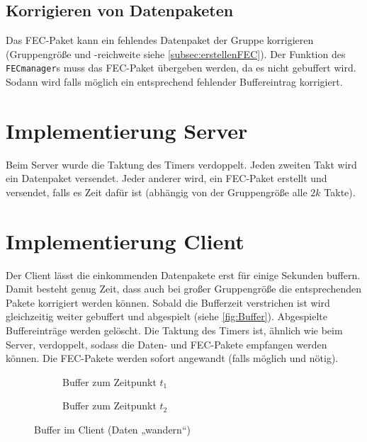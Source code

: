 \documentclass{scrartcl}
\begin{document}
\subsection{Korrigieren von Datenpaketen}
Das FEC-Paket kann ein fehlendes Datenpaket der Gruppe korrigieren (Gruppengröße und -reichweite siehe \autoref{subsec:erstellenFEC}). Der Funktion des \lstinline`FECmanager`s muss das FEC-Paket übergeben werden, da es nicht gebuffert wird. Sodann wird falls möglich ein entsprechend fehlender Buffereintrag korrigiert.

\section{Implementierung Server}

Beim Server wurde die Taktung des Timers verdoppelt. Jeden zweiten Takt wird ein Datenpaket versendet. Jeder anderer wird, ein FEC-Paket erstellt und versendet, falls es Zeit dafür ist (abhängig von der Gruppengröße alle $2k$ Takte). 

\section{Implementierung Client}

Der Client lässt die einkommenden Datenpakete erst für einige Sekunden buffern. Damit besteht genug Zeit, dass auch bei großer Gruppengröße die entsprechenden Pakete korrigiert werden können. Sobald die Bufferzeit verstrichen ist wird gleichzeitig weiter gebuffert und abgespielt (siehe \autoref{fig:Buffer}). Abgespielte Buffereinträge werden gelöscht. Die Taktung des Timers ist, ähnlich wie beim Server, verdoppelt, sodass die Daten- und FEC-Pakete empfangen werden können. Die FEC-Pakete werden sofort angewandt (falls möglich und nötig). 

\begin{figure}[!ht]
\centering
\begin{subfigure}[b]{0.5\textwidth}
\hspace*{2.5cm}
\caption{Buffer zum Zeitpunkt $t_1$}
\end{subfigure}
\qquad
\begin{subfigure}[b]{0.4\textwidth}
\hspace*{2.5cm}
\caption{Buffer zum Zeitpunkt $t_2$}
\end{subfigure}
\caption{Buffer im Client (Daten „wandern“)}\label{fig:Buffer}
\end{figure}
\end{document}
